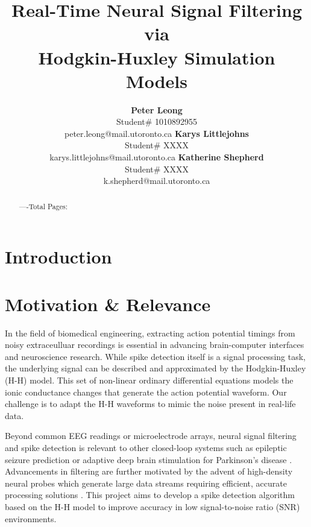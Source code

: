 \documentclass{article} %
\title{Real-Time Neural Signal Filtering via \\
Hodgkin-Huxley Simulation Models}
\author{\textbf{Peter Leong} \\
    Student\# 1010892955 \\
    peter.leong@mail.utoronto.ca
\And
    \textbf{Karys Littlejohns} \\
    Student\# XXXX \\
    karys.littlejohns@mail.utoronto.ca
\And
    \textbf{Katherine Shepherd} \\
    Student\# XXXX \\
    k.shepherd@mail.utoronto.ca
}
\begin{document}
\maketitle

\vspace{2ex}   %


\begin{abstract}

----Total Pages: \pageref{last_page}
\end{abstract}

\vspace{2ex}

\begin{multicols}{2}

\section{Introduction}

\section{Motivation \& Relevance}

In the field of biomedical engineering, extracting action potential timings from noisy extraceulluar recordings is essential in advancing brain-computer interfaces and neuroscience research.
While spike detection itself is a signal processing task, the underlying signal can be described and approximated by the Hodgkin-Huxley (H-H) model.
This set of non-linear ordinary differential equations models the ionic conductance changes that generate the action potential waveform.
Our challenge is to adapt the H-H waveforms to mimic the noise present in real-life data.

Beyond common EEG readings or microelectrode arrays, neural signal filtering and spike detection is relevant to other closed-loop systems such as epileptic seizure prediction \citep{addai-domfe2024epileptic} or adaptive deep brain stimulation for Parkinson's disease \citep{aljalal2022parkinson}.
Advancements in filtering are further motivated by the advent of high-density neural probes which generate large data streams requiring efficient, accurate processing solutions \citep{ye2024ultra}.
This project aims to develop a spike detection algorithm based on the H-H model to improve accuracy in low signal-to-noise ratio (SNR) environments.


\end{multicols}
\end{document}
